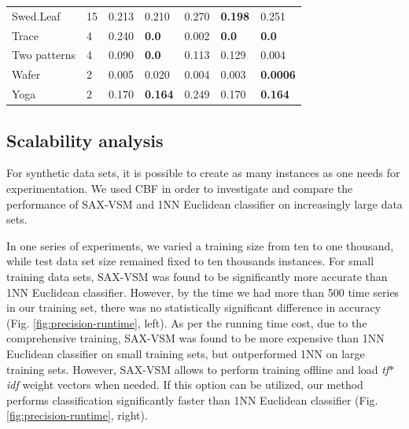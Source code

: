 \begin{footnotesize}
\begin{table}[t]
\begin{tabularx}{\linewidth}{@{} l *6X @{}}
Swed.Leaf   &15  & 0.213   & 0.210 & 0.270 & \textbf{0.198} & 0.251 \\
Trace            &4   & 0.240   & \textbf{0.0}    & 0.002     & \textbf{0.0} & \textbf{0.0} \\
Two patterns     &4   & 0.090   & \textbf{0.0}    & 0.113   & 0.129      & 0.004 \\
Wafer            &2    & 0.005   & 0.020     & 0.004  & 0.003 & \textbf{0.0006} \\
Yoga             &2    & 0.170   & \textbf{0.164}  & 0.249 & 0.170 & \textbf{0.164} \\
\bottomrule[1pt]
\end{tabularx}
\end{table}
\end{footnotesize}

\subsection{Scalability analysis}
For synthetic data sets, it is possible to create as many instances as one needs for
experimentation.
We used CBF \cite{citeulike:12563781} in order to investigate and compare the performance of SAX-VSM and 1NN
Euclidean classifier on increasingly large data sets.

In one series of experiments, we varied a training size from ten to one thousand, while test data
set size remained fixed to ten thousands instances. 
For small training data sets, SAX-VSM was found to be significantly more accurate than 1NN Euclidean
classifier. However, by the time we had more than 500 time series in our training set, there was no
statistically significant difference in accuracy (Fig. \ref{fig:precision-runtime}, left). 
As per the running time cost, due to the comprehensive training, SAX-VSM was found to be more
expensive than 1NN Euclidean classifier on small training sets, but outperformed 1NN on large
training sets.
However, SAX-VSM allows to perform training offline and load \textit{tf$\ast$idf} weight vectors
when needed. If this option can be utilized, our method performs classification significantly
faster than 1NN Euclidean classifier (Fig. \ref{fig:precision-runtime}, right).

